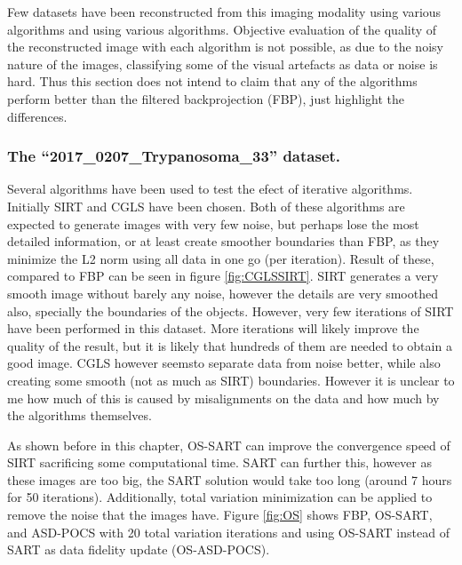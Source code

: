 Few datasets have been reconstructed from this imaging modality using various algorithms and using various algorithms. Objective evaluation of the quality of the reconstructed image with each algorithm is not possible, as due to the noisy nature of the images, classifying some of the visual artefacts as data or noise is hard. Thus this section does not intend to claim that any of the algorithms perform better than the filtered backprojection (FBP), just highlight the differences.

\subsubsection{The ``2017\_0207\_Trypanosoma\_33'' dataset.} Several algorithms have been used to test the efect of iterative algorithms.
Initially SIRT and CGLS have been chosen. Both of these algorithms are expected to generate images with very few noise, but perhaps lose the most detailed information, or at least create smoother boundaries than FBP, as they minimize the L2 norm using all data in one go (per iteration). Result of these, compared to FBP can be seen in figure \ref{fig:CGLSSIRT}. SIRT generates a very smooth image without barely any noise, however the details are very smoothed also, specially the boundaries of the objects. However, very few iterations of SIRT have been performed in this dataset. More iterations will likely improve the quality of the result, but it is likely that hundreds of them are needed to obtain a good image. CGLS however seemsto separate data from noise better, while also creating some smooth (not as much as SIRT) boundaries. However it is unclear to me how much of this is caused by misalignments on the data and how much by the algorithms themselves.

As shown before in this chapter, OS-SART can improve the convergence speed of SIRT sacrificing some computational time. SART can further this, however as these images are too big, the SART solution would take too long (around 7 hours for 50 iterations). Additionally, total variation minimization can be applied to remove the noise that the images have. Figure \ref{fig:OS} shows FBP, OS-SART, and ASD-POCS with 20 total variation iterations and using OS-SART instead of SART as data fidelity update (OS-ASD-POCS).

